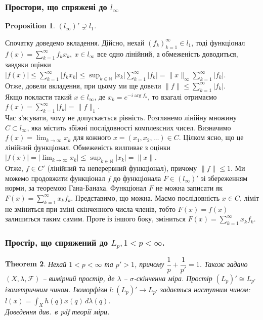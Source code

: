 \documentclass[a4paper, 10pt]{article}
\theoremstyle{theoremdd}
\newtheorem{theorem}{Theorem}[subsection]
\theoremstyle{theoremdd}
\theoremstyle{theoremdd}
\theoremstyle{theoremdd}
\theoremstyle{theoremdd}
\newtheorem{proposition}[theorem]{Proposition}
\theoremstyle{theoremdd}
\theoremstyle{theoremdd}
\theoremstyle{theoremdd}
\begin{document}
\subsubsection{Простори, що спряжені до $l_\infty$}
\begin{proposition}
$(l_\infty)' \supsetneq l_1$.
\end{proposition}
\noindent
Спочатку доведемо вкладення. Дійсно, нехай $(f_k)_{k=1}^\infty \in l_1$, тоді функціонал $f(x) = \displaystyle\sum_{k=1}^\infty f_k x_k,\ x \in l_\infty$ все одно лінійний, а обмеженість доводиться, завдяки оцінки\\
$|f(x)| \leq \displaystyle\sum_{k=1}^\infty |f_k x_k| \leq \sup_{k \in \mathbb{N}} |x_k| \sum_{k=1}^\infty |f_k| = \|x\|_\infty \sum_{k=1}^\infty |f_k|$.\\
Отже, довели вкладення, при цьому ми ще довели $\|f\| \leq \displaystyle\sum_{k=1}^\infty |f_k|$.\\
Якщо покласти такий $x \in l_\infty$, де $x_k = e^{-i \arg f_k}$, то взагалі отримаємо $f(x) = \displaystyle\sum_{k=1}^\infty |f_k| = \|f\|_1$.
\bigskip \\
Час з'ясувати, чому не допускається рівність. Розглянемо лінійну множину $C \subset l_\infty$, яка містить збіжні послідовності комплексних чисел. Визначимо $f(x) = \displaystyle\lim_{k \to \infty} x_k$ для кожного $x = (x_1,x_2,\dots) \in C$. Цілком ясно, що це лінійний функціонал. Обмеженість вилпиває з оцінки $|f(x)| = \displaystyle \left| \lim_{k \to \infty} x_k \right| \leq \sup_{k \in \mathbb{N}} |x_k| = \|x\|$.\\
Отже, $f \in C'$ (лінійний та неперервний функціонал), причому $\|f\| \leq 1$. Ми можемо продовжити функціонал $f$ до функціонала $F \in (l_\infty)'$ зі збереженням норми, за теоремою Гана-Банаха. Функціонал $F$ не можна записати як $F(x) = \displaystyle\sum_{k=1}^\infty x_k f_k$. Представимо, що можна. Маємо послідовність $x \in C$, ліміт не зміниться при зміні скінченного числа членів, тобто $F(x) = f(x)$ залишиться таким самим. Проте із іншого боку, зміниться $F(x) = \displaystyle\sum_{k=1}^\infty x_k f_k$.

\subsubsection{Простір, що спряжений до $L_p, 1 < p < \infty$.}
\begin{theorem}
Нехай $1 < p < \infty$ та $p' > 1$, причому $\dfrac{1}{p} + \dfrac{1}{p'} = 1$. Також задано $(X,\lambda,\mathcal{F})$ -- вимірний простір, де $\lambda$ -- $\sigma$-скінченна міра. Простір $(L_p)' \cong L_{p'}$ ізометричним чином. Ізоморфізм $l \colon (L_p)' \to L_{p'}$ задається наступним чином:\\
$l(x) = \displaystyle\int_X h(q) x(q)\,d\lambda(q)$.\\
\textit{Доведення див.\ в pdf теорії міри.}
\end{theorem}
\end{document}
